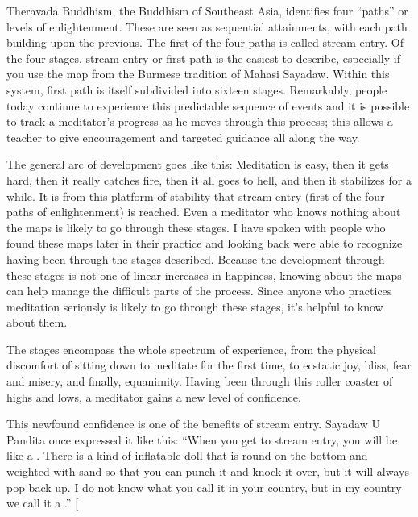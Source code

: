 \documentclass[a5paper,10pt,english]{book}
\begin{document}
\sphinxAtStartPar
Theravada Buddhism, the Buddhism of Southeast Asia, identifies four
“paths” or levels of enlightenment. These are seen as sequential
attainments, with each path building upon the previous. The first of the
four paths is called stream entry. Of the four stages, stream entry or
first path is the easiest to describe, especially if you use the map
from the Burmese tradition of Mahasi Sayadaw. Within this system, first
path is itself subdivided into sixteen stages. Remarkably, people today
continue to experience this predictable sequence of events and it is
possible to track a meditator’s progress as he moves through this
process; this allows a teacher to give encouragement and targeted
guidance all along the way.

\sphinxAtStartPar
The general arc of development goes like this: Meditation is easy, then
it gets hard, then it really catches fire, then it all goes to hell, and
then it stabilizes for a while. It is from this platform of stability
that stream entry (first of the four paths of enlightenment) is reached.
Even a meditator who knows nothing about the maps is likely to go
through these stages. I have spoken with people who found these maps
later in their practice and looking back were able to recognize having
been through the stages described. Because the development through these
stages is not one of linear increases in happiness, knowing about the
maps can help manage the difficult parts of the process. Since anyone
who practices meditation seriously is likely to go through these stages,
it’s helpful to know about them.

\sphinxAtStartPar
The stages encompass the whole spectrum of experience, from the physical
discomfort of sitting down to meditate for the first time, to ecstatic
joy, bliss, fear and misery, and finally, equanimity. Having been
through this roller coaster of highs and lows, a meditator gains a new
level of confidence.

\sphinxAtStartPar
This newfound confidence is one of the benefits of stream entry. Sayadaw
U Pandita once expressed it like this: “When you get to stream entry,
you will be like a . There is a kind of inflatable doll that
is round on the bottom and weighted with sand so that you can punch it
and knock it over, but it will always pop back up. I do not know what
you call it in your country, but in my country we call it a .” {[}\sphinxstyleemphasis{The bobo doll analogy came while U Pandita was speaking to a
group of foreign (non\sphinxhyphen{}Burmese) yogis on long term silent retreat at his
monastery in Rangoon.}{]}
\end{document}
